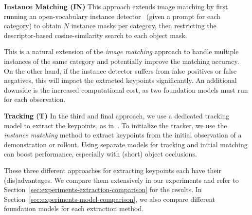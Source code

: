 \documentclass[letterpaper, 10 pt, conference]{ieeeconf}  %
\newcommand{\thomas}[1]{{\color{ForestGreen} TL: #1}}
\begin{document}
\textbf{Instance Matching (IN)}
This approach extends image matching by first running an open-vocabulary instance detector~\cite{carion2025sam3} (given a prompt for each category) to obtain $N$ instance masks per category, then restricting the descriptor-based cosine-similarity search to each object mask. 

This is a natural extension of the \textit{image matching} approach to handle multiple instances of the same category and potentially improve the matching accuracy. On the other hand, if the instance detector suffers from false positives or false negatives, this will impact the extracted keypoints significantly. An additional downside is the increased computational cost, as two foundation models must run for each observation. %


\textbf{Tracking (T)}
In the third and final approach, we use a dedicated tracking model to extract the keypoints, as in~\cite{Levy2025P3PO,haldar2025pointpolicy,vecerik2024robotap}.
To initialize the tracker, we use the \textit{instance matching} method to extract keypoints from the initial observation of a demonstration or rollout. Using separate models for tracking and initial matching can boost performance, especially with (short) object occlusions. 


These three different approaches for extracting keypoints each have their (dis)advantages. We compare them extensively in our experiments and refer to Section~\ref{sec:experiments-extraction-comparison} for the results. In Section~\ref{sec:experiments-model-comparison}, we also compare different foundation models for each extraction method.
\end{document}
